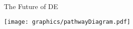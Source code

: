 \documentclass{beamer}
\begin{document}
\begin{frame}{The Future of DE}


%  

\texttt{[image: graphics/pathwayDiagram.pdf]}



\end{frame}
\end{document}
